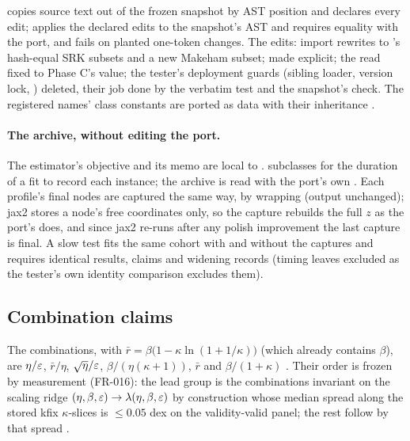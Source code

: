  copies source text out of the frozen snapshot  by AST
position and declares every edit;  applies the declared edits to the snapshot's
AST and requires equality with the port, and fails on planted one-token changes. The edits: import rewrites to
's hash-equal SRK subsets and a new Makeham subset;  made explicit; the
 read fixed to Phase C's value; the tester's deployment guards (sibling loader, version lock,
) deleted, their job done by the verbatim test and the snapshot's  check.
The registered names' class constants are ported as data with their inheritance .

\paragraph{The archive, without editing the port.} The estimator's objective and its memo are local to .
 subclasses  for the duration of a fit to
record each instance; the archive is read with the port's own . Each profile's final nodes are
captured the same way, by wrapping  (output unchanged); jax2 stores a node's free coordinates only,
so the capture rebuilds the full $z$ as the port's  does, and since jax2 re-runs 
after any polish improvement the last capture is final. A slow test fits the same cohort with and
without the captures and requires identical results, claims and widening records (timing leaves excluded as the
tester's own identity comparison excludes them).

\subsection{Combination claims}\label{sec:pj-combos}

The combinations, with $\bar r=\beta\bigl(1-\kappa\ln(1+1/\kappa)\bigr)$ (which already contains $\beta$), are
$\eta/\varepsilon$, $\bar r/\eta$, $\sqrt\eta/\varepsilon$, $\beta/(\eta(\kappa+1))$, $\bar r$ and $\beta/(1+\kappa)$ .
Their order is frozen by measurement (FR-016): the lead group is the combinations invariant on the scaling ridge
$(\eta,\beta,\varepsilon)\to\lambda(\eta,\beta,\varepsilon)$ by construction whose median spread along the stored kfix
$\kappa$-slices is $\le0.05$ dex on the validity-valid panel; the rest follow by that spread
.

